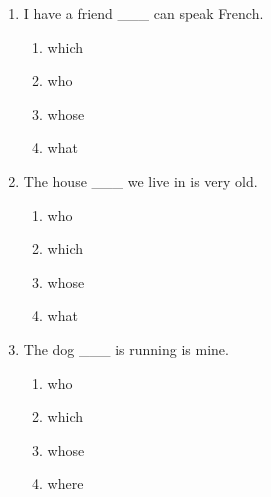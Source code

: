 \documentclass[11pt,a4paper]{ctexart}
\begin{document}
\begin{enumerate}[leftmargin=*,itemsep=4pt]
\begin{enumerate}[label=\Alph*.,leftmargin=2em,itemsep=1pt,topsep=2pt]
\item where
\end{enumerate}
\item I have a friend \_\_\_ can speak French.
\begin{enumerate}[label=\Alph*.,leftmargin=2em,itemsep=1pt,topsep=2pt]
\item which
\item who
\item whose
\item what
\end{enumerate}
\item The house \_\_\_ we live in is very old.
\begin{enumerate}[label=\Alph*.,leftmargin=2em,itemsep=1pt,topsep=2pt]
\item who
\item which
\item whose
\item what
\end{enumerate}
\item The dog \_\_\_ is running is mine.
\begin{enumerate}[label=\Alph*.,leftmargin=2em,itemsep=1pt,topsep=2pt]
\item who
\item which
\item whose
\item where
\end{enumerate}
\end{enumerate}
\end{document}
